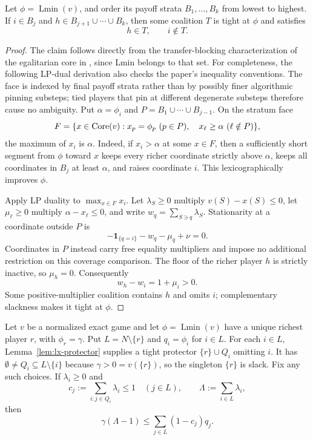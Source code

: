 \begin{lemma}\label{lem:lx-protector}
Let $\phi=\operatorname{Lmin}(v)$, and order its payoff strata
$B_1,\ldots,B_k$ from lowest to highest.  If $i\in B_j$ and
$h\in B_{j+1}\cup\cdots\cup B_k$, then some coalition $T$ is tight at
$\phi$ and satisfies
\[
 h\in T,\qquad i\notin T.
 \tag{PC}\label{eq:lx-protector}
\]
\end{lemma}

\begin{proof}
The claim follows directly from the transfer-blocking characterization of the
egalitarian core in \citet{ArinInarra2001}, since Lmin belongs to that set.
For completeness, the following LP-dual derivation also checks the paper's
inequality conventions.  The face is indexed by final payoff strata rather
than by possibly finer algorithmic pinning substeps; tied players that pin at
different degenerate substeps therefore cause no ambiguity.
Put $\alpha=\phi_i$ and $P=B_1\cup\cdots\cup B_{j-1}$.  On the stratum face
\[
 F=\{x\in\operatorname{Core}(v):x_p=\phi_p\ (p\in P),\quad
                    x_\ell\geq\alpha\ (\ell\notin P)\},
\]
the maximum of $x_i$ is $\alpha$.  Indeed, if $x_i>\alpha$ at some
$x\in F$, then a sufficiently short segment from $\phi$ toward $x$ keeps
every richer coordinate strictly above $\alpha$, keeps all coordinates in
$B_j$ at least $\alpha$, and raises coordinate $i$.  This lexicographically
improves $\phi$.

Apply LP duality to $\max_{x\in F}x_i$.  Let $\lambda_S\geq0$ multiply
$v(S)-x(S)\leq0$, let $\mu_\ell\geq0$ multiply
$\alpha-x_\ell\leq0$, and write
$w_q=\sum_{S\ni q}\lambda_S$.  Stationarity at a coordinate outside $P$ is
\[
 -\mathbf1_{\{q=i\}}-w_q-\mu_q+\nu=0.
\]
Coordinates in $P$ instead carry free equality multipliers and impose no
additional restriction on this coverage comparison.
The floor of the richer player $h$ is strictly inactive, so $\mu_h=0$.
Consequently
\[
 w_h-w_i=1+\mu_i>0.
\]
Some positive-multiplier coalition contains $h$ and omits $i$; complementary
slackness makes it tight at $\phi$.
\end{proof}

\begin{lemma}
\label{lem:lx-protector-packing}
Let $v$ be a normalized exact game and let
$\phi=\operatorname{Lmin}(v)$ have a unique richest player $r$, with
$\phi_r=\gamma$.  Put $L=N\setminus\{r\}$ and $q_i=\phi_i$ for $i\in L$.
For each $i\in L$, Lemma~\ref{lem:lx-protector} supplies a tight protector
$\{r\}\cup Q_i$ omitting $i$.  It has
$\emptyset\ne Q_i\subseteq L\setminus\{i\}$ because
$\gamma>0=v(\{r\})$, so the singleton $\{r\}$ is slack.  Fix any such
choices.  If $\lambda_i\geq0$ and
\[
 c_j:=\sum_{i:j\in Q_i}\lambda_i\leq1\quad(j\in L),
 \qquad \Lambda:=\sum_{i\in L}\lambda_i,
\]
then
\[
 \gamma(\Lambda-1)\leq
 \sum_{j\in L}(1-c_j)q_j.                              \tag{FP}
 \label{eq:lx-fractional-packing}
\]
\end{lemma}

